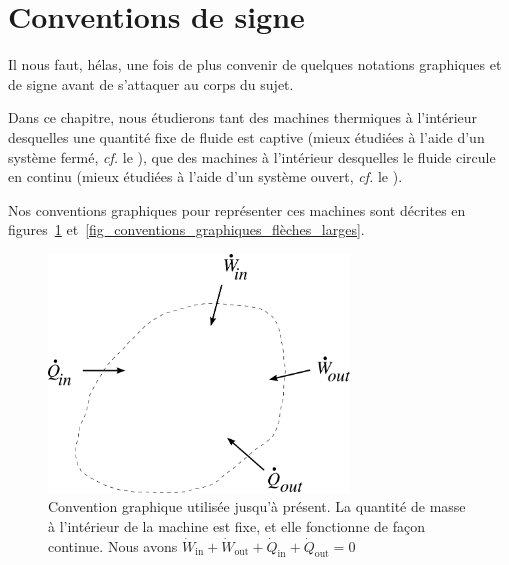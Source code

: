 \section{Conventions de signe}

	Il nous faut, hélas, une fois de plus convenir de quelques notations graphiques et de signe avant de s’attaquer au corps du sujet.

	Dans ce chapitre, nous étudierons tant des machines thermiques à l’intérieur desquelles une quantité fixe de fluide est captive (mieux étudiées à l’aide d’un système fermé, \textit{cf.} le \coursdeuxshort), que des machines à l’intérieur desquelles le fluide circule en continu (mieux étudiées à l’aide d’un système ouvert, \textit{cf.} le \courstroisshort).

	Nos conventions graphiques pour représenter ces machines sont décrites en figures~\ref{fig_conventions_graphiques_flèches_petites} et~\ref{fig_conventions_graphiques_flèches_larges}.

	\begin{figure}
		\begin{center}
			\includegraphics[width=8cm]{images/cours6-img3.png}
		\end{center}
		\caption{Convention graphique utilisée jusqu’à présent.
			La quantité de masse à l’intérieur de la machine est fixe, et elle fonctionne de façon continue.
			Nous avons $\dot{W}_\text{in} + \dot{W}_\text{out} + \dot{Q}_\text{in} + \dot{Q}_\text{out} = 0$}
		\label{fig_conventions_graphiques_flèches_petites}
	\end{figure}

